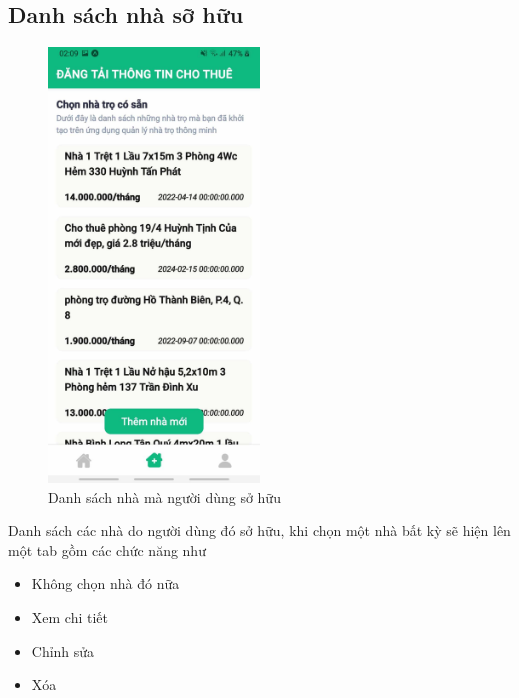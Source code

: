 \subsection{Danh sách nhà sỡ hữu}\begin{figure}[H]
    \centering
    \includegraphics[width=0.5\textwidth]{Images/app_image/app_3.jpg}
    \caption{Danh sách nhà mà người dùng sở hữu}
\end{figure}
Danh sách các nhà do người dùng đó sở hữu, khi chọn một nhà bất kỳ sẽ hiện lên một tab gồm các chức năng như
\begin{itemize}
    \item Không chọn nhà đó nữa
    \item Xem chi tiết
    \item Chỉnh sửa
    \item Xóa
\end{itemize}

